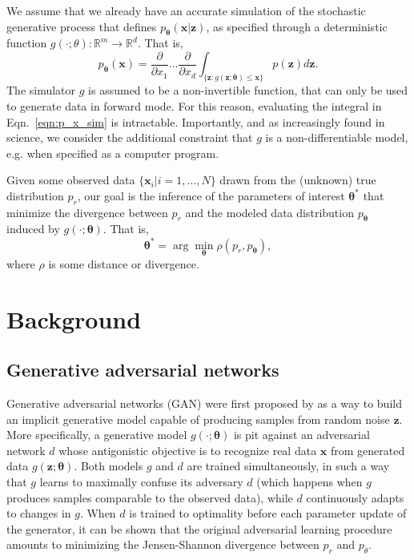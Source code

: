 \documentclass[twocolumn,superscriptaddress,aps]{revtex4-1}
\theoremstyle{plain}
\begin{document}
We assume that we already have an accurate simulation of the stochastic generative process
that defines $p_\mathbf{\theta}(\mathbf{x}|\mathbf{z})$, as specified through a deterministic function $g(\cdot;
\theta) : \mathbb{R}^m \to \mathbb{R}^d$. That is,
\begin{equation}\label{eqn:p_x_sim}
    p_\mathbf{\theta}(\mathbf{x}) = \frac{\partial}{\partial x_1} \dots \frac{\partial}{\partial x_d} \int_{\{\mathbf{z}:g(\mathbf{z};\mathbf{\theta}) \leq \mathbf{x}\}} p(\mathbf{z}) d\mathbf{z}.
\end{equation}
The simulator $g$ is assumed to be a non-invertible function, that can
only be used to generate data in forward mode.
For this reason, evaluating the integral in Eqn.~\ref{eqn:p_x_sim} is intractable.
Importantly, and as increasingly found in science, we consider the additional constraint that $g$ is a non-differentiable
model, e.g. when specified as a computer program.

Given some observed data $\{ \mathbf{x}_i | i=1, \dots, N \}$ drawn from the (unknown) true distribution $p_r$, our goal is the inference
of the parameters of interest $\mathbf{\theta}^*$ that minimize the divergence
between $p_r$ and the modeled
data distribution $p_\mathbf{\theta}$ induced by $g(\cdot; \mathbf{\theta})$. That is,
\begin{equation}
    \mathbf{\theta}^* = \arg \min_\mathbf{\theta} \rho(p_r, p_\mathbf{\theta}),
\end{equation}
where $\rho$ is some distance or divergence.



\section{Background}

\subsection{Generative adversarial networks}

Generative adversarial networks (GAN) were first proposed by
\cite{goodfellow2014generative} as a way to build an implicit generative model
capable of producing samples from random noise $\mathbf{z}$. More specifically,
a generative model $g(\cdot; \mathbf{\theta})$ is pit against an adversarial
network $d$ whose antigonistic objective is to recognize real data $\mathbf{x}$
from generated data $g(\mathbf{z}; \mathbf{\theta})$. Both models $g$ and $d$
are trained simultaneously, in such a way that $g$ learns to maximally confuse
its adversary $d$ (which happens when $g$ produces samples comparable to the
observed data), while $d$ continuously adapts to changes in $g$. When $d$ is
trained to optimality before each parameter update of the generator, it can
be shown that the original adversarial learning procedure amounts to minimizing
the Jensen-Shannon divergence between $p_r$ and $p_\theta$.
\end{document}
